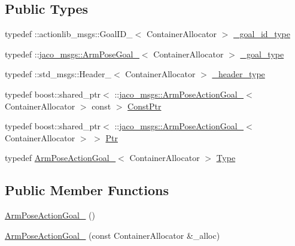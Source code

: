 \subsection*{Public Types}
\begin{DoxyCompactItemize}
\item 
typedef \+::actionlib\+\_\+msgs\+::\+Goal\+I\+D\+\_\+$<$ Container\+Allocator $>$ \hyperlink{structjaco__msgs_1_1ArmPoseActionGoal___a9135f1a63598eb8454905638ce80bff5}{\+\_\+goal\+\_\+id\+\_\+type}
\item 
typedef \+::\hyperlink{structjaco__msgs_1_1ArmPoseGoal__}{jaco\+\_\+msgs\+::\+Arm\+Pose\+Goal\+\_\+}$<$ Container\+Allocator $>$ \hyperlink{structjaco__msgs_1_1ArmPoseActionGoal___af13ef7dee9d0b00a56d9fca8c439a3d0}{\+\_\+goal\+\_\+type}
\item 
typedef \+::std\+\_\+msgs\+::\+Header\+\_\+$<$ Container\+Allocator $>$ \hyperlink{structjaco__msgs_1_1ArmPoseActionGoal___aacdb1a8727f44b8684f1df0564c60ce6}{\+\_\+header\+\_\+type}
\item 
typedef boost\+::shared\+\_\+ptr$<$ \+::\hyperlink{structjaco__msgs_1_1ArmPoseActionGoal__}{jaco\+\_\+msgs\+::\+Arm\+Pose\+Action\+Goal\+\_\+}$<$ Container\+Allocator $>$ const  $>$ \hyperlink{structjaco__msgs_1_1ArmPoseActionGoal___aeb4d228097324458156ee887c02b2103}{Const\+Ptr}
\item 
typedef boost\+::shared\+\_\+ptr$<$ \+::\hyperlink{structjaco__msgs_1_1ArmPoseActionGoal__}{jaco\+\_\+msgs\+::\+Arm\+Pose\+Action\+Goal\+\_\+}$<$ Container\+Allocator $>$ $>$ \hyperlink{structjaco__msgs_1_1ArmPoseActionGoal___a61803adc8de377886afdf0be69ef204d}{Ptr}
\item 
typedef \hyperlink{structjaco__msgs_1_1ArmPoseActionGoal__}{Arm\+Pose\+Action\+Goal\+\_\+}$<$ Container\+Allocator $>$ \hyperlink{structjaco__msgs_1_1ArmPoseActionGoal___a9e089e364323cc5d5e1ede2fc5648adb}{Type}
\end{DoxyCompactItemize}
\subsection*{Public Member Functions}
\begin{DoxyCompactItemize}
\item 
\hyperlink{structjaco__msgs_1_1ArmPoseActionGoal___a5ef00a64135c5b56eae7d254ce41aed3}{Arm\+Pose\+Action\+Goal\+\_\+} ()
\item 
\hyperlink{structjaco__msgs_1_1ArmPoseActionGoal___a7242d450928ff9705a245f575f906fd9}{Arm\+Pose\+Action\+Goal\+\_\+} (const Container\+Allocator \&\+\_\+alloc)
\end{DoxyCompactItemize}

